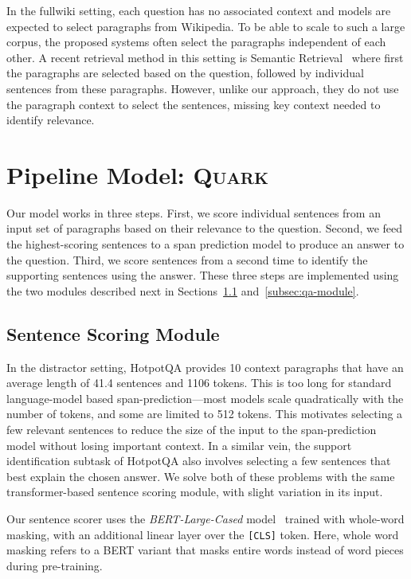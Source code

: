 \documentclass[11pt,a4paper]{article}
\newcommand\model{\textsc{Quark}\xspace}
\newcommand{\hpqa}{HotpotQA\xspace}
\newcommand{\ourlm}{\emph{BERT-Large-Cased}\xspace}
\begin{document}
In the fullwiki setting, each question has no associated context and models are expected to select paragraphs from Wikipedia. To be able to scale to such a large corpus, the proposed systems often select the paragraphs independent of each other. A recent retrieval method  in this setting is Semantic Retrieval~\cite{semanticmrs} where first the paragraphs are selected based on the question, followed by individual sentences from these paragraphs. However, unlike our approach, they do not use the paragraph context to select the sentences, missing key context needed to identify relevance.


\section{Pipeline Model: \model}

Our model works in three steps. First, we score individual sentences from an input set of paragraphs  based on their relevance to the question. Second, we feed the highest-scoring sentences to a span prediction model to produce an answer to the question. Third, we score sentences from  a second time to identify the supporting sentences using the answer.
These three steps are implemented using the two modules described next in Sections~\ref{subsec:sentence-scoring-module} and~\ref{subsec:qa-module}.


\subsection{Sentence Scoring Module}
\label{subsec:sentence-scoring-module}

In the distractor setting, \hpqa provides 10 context paragraphs that have an average length of 41.4 sentences and 1106 tokens. This is too long for standard language-model based span-prediction---most models scale quadratically with the number of tokens, and some are limited to 512 tokens. This motivates selecting a few relevant sentences  to reduce the size of the input to the span-prediction model without losing important context. In a similar vein, the support identification subtask of \hpqa also involves selecting a few sentences that best explain the chosen answer. We solve both of these problems with the same transformer-based sentence scoring module, with slight variation in its input.

Our sentence scorer uses the \ourlm model~\cite{devlin2018bert} trained with whole-word masking, with an additional linear layer over the \texttt{[CLS]} token. Here, whole word masking refers to a BERT variant that masks entire words instead of word pieces during pre-training. 
\end{document}
